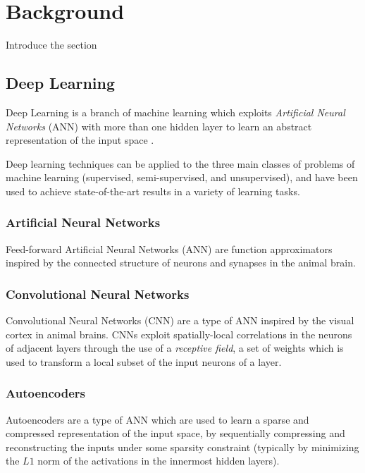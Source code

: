 \chapter{Background}
\label{ch1_intro}
\thispagestyle{empty}

\vspace{0.5cm}

\noindent Introduce the section

\section{Deep Learning}
Deep Learning is a branch of machine learning which exploits \textit{Artificial 
Neural Networks} (ANN) with more than one hidden layer to learn an abstract 
representation of the input space \cite{lecun2015deep}. 

Deep learning techniques can be applied to the three main classes of problems 
of machine learning (supervised, semi-supervised, and unsupervised), and have 
been used to achieve state-of-the-art results in a variety of learning tasks.

\subsection{Artificial Neural Networks}
Feed-forward Artificial Neural Networks (ANN) are function approximators 
inspired by the connected structure of neurons and synapses in the animal brain.

\subsection{Convolutional Neural Networks}
Convolutional Neural Networks (CNN) are a type of ANN inspired by the visual 
cortex in animal brains.
CNNs exploit spatially-local correlations in the neurons of adjacent 
layers through the use of a \textit{receptive field}, a set of weights which is 
used to transform a local subset of the input neurons of a layer.


\subsection{Autoencoders}
Autoencoders are a type of ANN which are used to learn a sparse and compressed 
representation of the input space, by sequentially compressing and 
reconstructing the inputs under some sparsity constraint (typically by 
minimizing the $L1$ norm of the activations in the innermost hidden layers).


